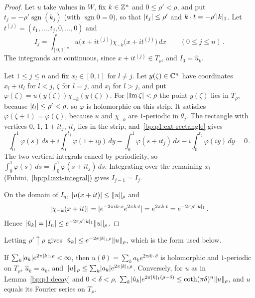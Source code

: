 \begin{proof}
Let $u$ take values in $W$, fix $k\in\mathbb{Z}^n$ and $0\le\rho'<\rho$, and put $t_j=-\rho'\operatorname{sgn}(k_j)$
(with $\operatorname{sgn}0=0$), so that $\lvert t_j\rvert\le\rho'$ and $k\cdot t=-\rho'\lvert k\rvert_1$. Let
$t^{(j)}=(t_1,\dots,t_j,0,\dots,0)$ and
\begin{equation*}
I_j=\int_{[0,1]^n}u\bigl(x+it^{(j)}\bigr)\chi_{-k}\bigl(x+it^{(j)}\bigr)\,dx\qquad(0\le j\le n)\,.
\end{equation*}
The integrands are continuous, since $x+it^{(j)}\in T_\rho$, and $I_0=\hat u_k$.

\label{step:p1:dec-shift}
Let $1\le j\le n$ and fix $x_l\in[0,1]$ for $l\ne j$. Let $y(\zeta)\in\mathbb{C}^n$ have coordinates $x_l+it_l$ for
$l<j$, $\zeta$ for $l=j$, and $x_l$ for $l>j$, and put $\varphi(\zeta)=u(y(\zeta))\chi_{-k}(y(\zeta))$. For
$\lvert \operatorname{Im}\zeta\rvert<\rho$ the point $y(\zeta)$ lies in $T_\rho$, because $\lvert t_l\rvert\le\rho'<\rho$, so
$\varphi$ is holomorphic on this strip. It satisfies $\varphi(\zeta+1)=\varphi(\zeta)$, because $u$ and
$\chi_{-k}$ are $1$-periodic in $\theta_j$. The rectangle with vertices $0$, $1$, $1+it_j$, $it_j$ lies in
the strip, and~\ref{bp:p1:ext-rectangle} gives
\begin{equation*}
\int_0^1\varphi(s)\,ds+i\int_0^{t_j}\varphi(1+iy)\,dy-\int_0^1\varphi(s+it_j)\,ds-i\int_0^{t_j}\varphi(iy)\,dy=0\,.
\end{equation*}
The two vertical integrals cancel by periodicity, so $\int_0^1\varphi(s)\,ds=\int_0^1\varphi(s+it_j)\,ds$.
Integrating over the remaining $x_l$ (Fubini,~\ref{bp:p1:ext-integral}) gives $I_{j-1}=I_j$.

\label{step:p1:dec-bound}
On the domain of $I_n$, $\lvert u(x+it)\rvert\le\lVert u\rVert_\rho$ and
\begin{equation*}
\lvert \chi_{-k}(x+it)\rvert=\lvert e^{-2\pi ik\cdot x}e^{2\pi k\cdot t}\rvert=e^{2\pi k\cdot t}=e^{-2\pi\rho'\lvert k\rvert_1}\,.
\end{equation*}
Hence $\lvert \hat u_k\rvert=\lvert I_n\rvert\le e^{-2\pi\rho'\lvert k\rvert_1}\lVert u\rVert_\rho$.
\end{proof}

Letting $\rho'\uparrow\rho$ gives $\lvert \hat u_k\rvert\le e^{-2\pi\lvert k\rvert_1\rho}\lVert u\rVert_\rho$, which is the form
used below.

\begin{lemma}[Summation]\label{bp:p1:summation}
If $\sum_k\lvert a_k\rvert e^{2\pi\lvert k\rvert_1\rho}<\infty$, then $u(\theta)=\sum_ka_ke^{2\pi ik\cdot\theta}$ is
holomorphic and $1$-periodic on $T_\rho$, $\hat u_k=a_k$, and
$\lVert u\rVert_\rho\le\sum_k\lvert a_k\rvert e^{2\pi\lvert k\rvert_1\rho}$. Conversely, for $u$ as in
Lemma~\ref{bp:p1:decay} and $0<\delta<\rho$,
$\sum_k\lvert \hat u_k\rvert e^{2\pi\lvert k\rvert_1(\rho-\delta)}\le\coth(\pi\delta)^n\lVert u\rVert_\rho$, and $u$ equals
its Fourier series on $T_{\rho}$.
\end{lemma}

